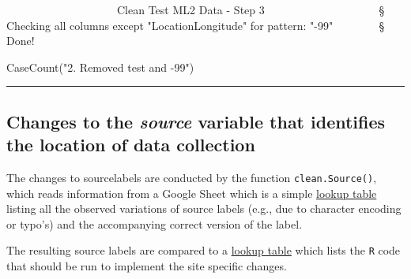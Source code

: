 \documentclass[]{article}
\newenvironment{Shaded}{\begin{snugshade}}{\end{snugshade}}
\newcommand{\KeywordTok}[1]{\textcolor[rgb]{0.94,0.87,0.69}{{#1}}}
\newcommand{\DecValTok}[1]{\textcolor[rgb]{0.86,0.86,0.80}{{#1}}}
\newcommand{\StringTok}[1]{\textcolor[rgb]{0.80,0.58,0.58}{{#1}}}
\newcommand{\CommentTok}[1]{\textcolor[rgb]{0.50,0.62,0.50}{{#1}}}
\newcommand{\ErrorTok}[1]{\textcolor[rgb]{0.76,0.75,0.62}{{#1}}}
\newcommand{\NormalTok}[1]{\textcolor[rgb]{0.80,0.80,0.80}{{#1}}}
\begin{document}
\begin{Shaded}
\begin{Highlighting}[]
    \NormalTok{~}\ErrorTok{~~~~~~~~~~~~~~~~~~~}\NormalTok{Clean Test ML2 Data -}\StringTok{ }\NormalTok{Step }\DecValTok{3}\NormalTok{~}\ErrorTok{~~~~~~~~~~~~~~~~~~~}
\StringTok{    }\NormalTok{§ Checking all columns except }\StringTok{"LocationLongitude"} \NormalTok{for pattern:}\StringTok{ "-99"}
    \NormalTok{~}\ErrorTok{~~~~~~}
\StringTok{    }\NormalTok{§ Done!}
\StringTok{    }\ErrorTok{~~~~~~~}

\KeywordTok{CaseCount}\NormalTok{(}\StringTok{"2. Removed test and -99"}\NormalTok{)}
\end{Highlighting}
\end{Shaded}

\begin{center}\rule{0.5\linewidth}{\linethickness}\end{center}

\subsection{Changes to the \emph{source} variable that identifies the
location of data
collection}\label{changes-to-the-source-variable-that-identifies-the-location-of-data-collection}

The changes to sourcelabels are conducted by the function
\texttt{clean.Source()}, which reads information from a Google Sheet
which is a simple
\href{https://docs.google.com/spreadsheets/d/1MpY5H9QJa6dc52BXRk6SIpCl4CMjC6bXTuit3i1Livs/}{lookup
table} listing all the observed variations of source labels (e.g., due
to character encoding or typo's) and the accompanying correct version of
the label.

\begin{Shaded}
\end{Shaded}

The resulting source labels are compared to a
\href{https://docs.google.com/spreadsheets/d/1OLKcyyoYfPds5s4wRpqzXU3lACFr94Ve-cR2l_zodtU/}{lookup
table} which lists the \texttt{R} code that should be run to implement
the site specific changes.
\end{document}

